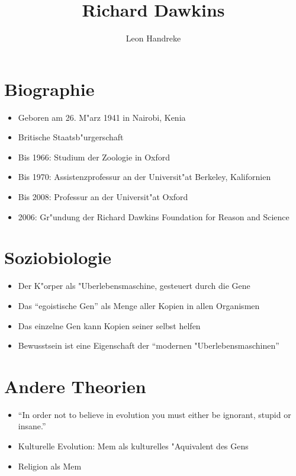 \documentclass[11pt]{article}
\title{Richard Dawkins}
\author{Leon Handreke}
\date{}                                           %
\begin{document}
\maketitle

\selectfont


\section{Biographie}

\begin{itemize}
\item Geboren am 26. M"arz 1941 in Nairobi, Kenia
\item Britische Staatsb"urgerschaft
\item Bis 1966: Studium der Zoologie in Oxford
\item Bis 1970: Assistenzprofessur an der Universit"at Berkeley, Kalifornien
\item Bis 2008: Professur an der Universit"at Oxford
\item 2006: Gr"undung der Richard Dawkins Foundation for Reason and Science
\end{itemize}


\section{Soziobiologie}

\begin{itemize}
\item Der K"orper als "Uberlebensmaschine, gesteuert durch die Gene
\item Das ``egoistische Gen'' als Menge aller Kopien in allen Organismen
\item Das einzelne Gen kann Kopien seiner selbst helfen
\item Bewusstsein ist eine Eigenschaft der ``modernen "Uberlebensmaschinen''
\end{itemize}

\section{Andere Theorien}
\begin{itemize}
\item ``In order not to believe in evolution you must either be ignorant, stupid or insane.''
\item Kulturelle Evolution: Mem als kulturelles "Aquivalent des Gens
\item Religion als Mem
\end{itemize}
\end{document}
